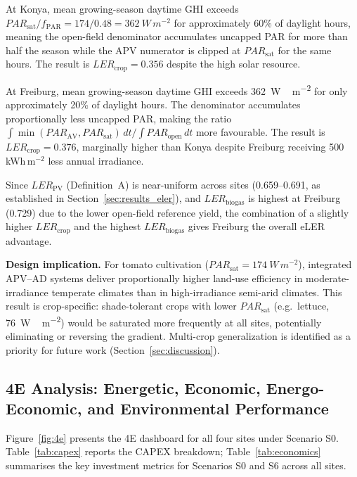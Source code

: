 At Konya, mean growing-season daytime GHI exceeds
$PAR_{\text{sat}} / f_{\text{PAR}} = 174 / 0.48 =
\SI{362}{W\,m^{-2}}$ for approximately 60\% of daylight hours,
meaning the open-field denominator accumulates uncapped PAR for more
than half the season while the APV numerator is clipped at
$PAR_{\text{sat}}$ for the same hours. The result is
$LER_{\text{crop}} = 0.356$ despite the high solar resource.

At Freiburg, mean growing-season daytime GHI exceeds
\SI{362}{W\,m^{-2}} for only approximately 20\% of daylight hours.
The denominator accumulates proportionally less uncapped PAR,
making the ratio $\int\min(PAR_{\text{AV}}, PAR_{\text{sat}})\,dt /
\int PAR_{\text{open}}\,dt$ more favourable. The result is
$LER_{\text{crop}} = 0.376$, marginally higher than Konya despite
Freiburg receiving 500\,kWh\,m$^{-2}$ less annual irradiance.

Since $LER_{\text{PV}}$ (Definition~A) is near-uniform across sites
(0.659--0.691, as established in Section~\ref{sec:results_eler}),
and $LER_{\text{biogas}}$ is highest at Freiburg (0.729) due to the
lower open-field reference yield, the combination of a slightly
higher $LER_{\text{crop}}$ and the highest $LER_{\text{biogas}}$
gives Freiburg the overall eLER advantage.

\textbf{Design implication.} For tomato cultivation
($PAR_{\text{sat}} = \SI{174}{W\,m^{-2}}$), integrated APV--AD
systems deliver proportionally higher land-use efficiency in
moderate-irradiance temperate climates than in high-irradiance
semi-arid climates. This result is crop-specific: shade-tolerant
crops with lower $PAR_{\text{sat}}$ (e.g.\ lettuce,
\SI{76}{W\,m^{-2}}) would be saturated more frequently at all
sites, potentially eliminating or reversing the gradient. Multi-crop
generalization is identified as a priority for future work
(Section~\ref{sec:discussion}).
\subsection{4E Analysis: Energetic, Economic, Energo-Economic,
	and Environmental Performance}
\label{sec:results_4e}

\hspace{1cm}Figure~\ref{fig:4e} presents the 4E dashboard for all
four sites under Scenario S0. Table~\ref{tab:capex} reports the CAPEX
breakdown; Table~\ref{tab:economics} summarises the key investment
metrics for Scenarios S0 and S6 across all sites.

